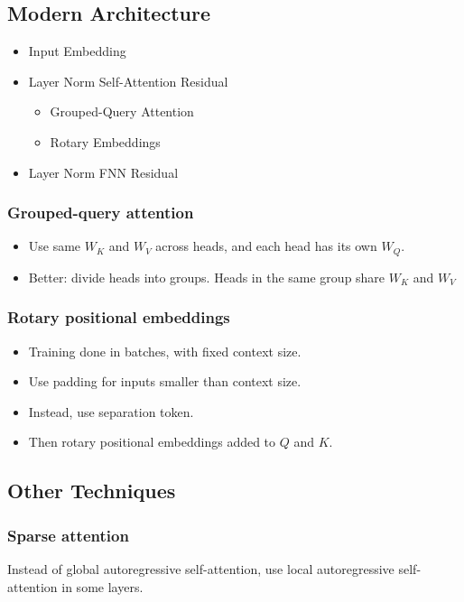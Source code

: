 \documentclass[../ds]{subfiles}
\begin{document}
\subsection{Modern Architecture}
\begin{itemize}
    \item Input Embedding
    \item Layer Norm \textrightarrow{} Self-Attention \textrightarrow{} Residual
        \begin{itemize}
            \item Grouped-Query Attention
            \item Rotary Embeddings
        \end{itemize}
    \item Layer Norm \textrightarrow{} FNN \textrightarrow{} Residual
\end{itemize}

\subsubsection{Grouped-query attention}
\begin{itemize}
    \item Use same $W_K$ and $W_V$ across heads, and each head has its own $W_Q.$
    \item Better: divide heads into groups. Heads in the same group share $W_K$ and $W_V$
\end{itemize}

\subsubsection{Rotary positional embeddings}
\begin{itemize}
    \item Training done in batches, with fixed context size.
    \item Use padding for inputs smaller than context size.
    \item Instead, use separation token.
    \item Then rotary positional embeddings added to $Q$ and $K.$
\end{itemize}

\subsection{Other Techniques}
\subsubsection{Sparse attention}
Instead of global autoregressive self-attention, use local autoregressive self-attention in some layers.
\end{document}
